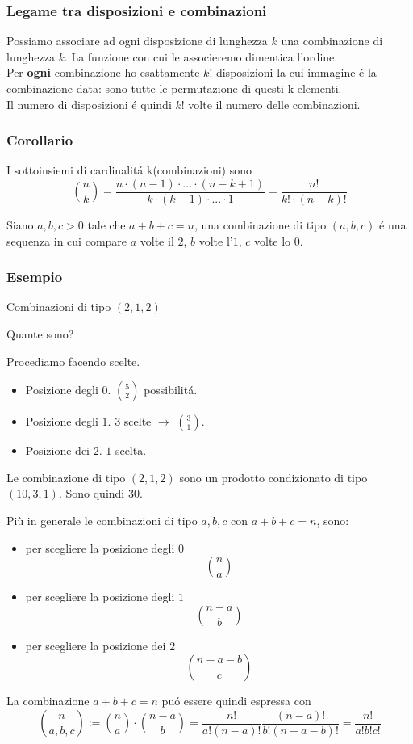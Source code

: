 \documentclass[11pt]{article}
\begin{document}
            \subsubsection{Legame tra disposizioni e combinazioni}
            Possiamo associare ad ogni disposizione di lunghezza $k$ una combinazione di lunghezza $k$. La funzione con cui le associeremo dimentica l'ordine.\\
            Per \textbf{ogni} combinazione ho esattamente $k!$ disposizioni la cui immagine \'e la combinazione data: sono tutte le permutazione di questi k elementi.\\
            Il numero di disposizioni \'e quindi $k!$ volte il numero delle combinazioni.
			\subsubsection{Corollario}
			I sottoinsiemi di cardinalit\'a k(combinazioni) sono \\ \[\binom{n}{k}=\frac{n\cdot(n-1)\cdot...\cdot(n-k+1)}{k\cdot(k-1)\cdot...\cdot1}=\frac{n!}{k!\cdot(n-k)!}\]
			
			Siano $a,b,c > 0$ tale che $a+b+c=n$, una combinazione di tipo
			$(a,b,c)$ \'e una sequenza in cui compare $a$ volte il $2$,
			$b$ volte l'$1$, $c$ volte lo $0$.

			\subsubsection{Esempio}

			Combinazioni di tipo $(2,1,2)$

			Quante sono?

			Procediamo facendo scelte.\begin{itemize}

				\item Posizione degli $0$. $\binom{5}{2}$ possibilit\'a.
				\item Posizione degli $1$. $3$ scelte $\to$ $\binom{3}{1}$.
				\item Posizione dei $2$. $1$ scelta.
			\end{itemize}

			Le combinazione di tipo $(2,1,2)$ sono un prodotto condizionato
			di tipo $(10,3,1)$. Sono quindi $30$.

			Pi\`u in generale le combinazioni di tipo $a,b,c$ con $a+b+c=n$,
			sono: \begin{itemize}
				\item per scegliere la posizione degli $0$ \[\binom{n}{a}\]
				\item per scegliere la posizione degli $1$ \[\binom{n-a}{b}\]
				\item per scegliere la posizione dei $2$ \[\binom{n-a-b}{c}\]
			\end{itemize}
			La combinazione $a+b+c=n$ pu\'o essere quindi espressa con
			\[\binom{n}{a , b , c} := \binom{n}{a} \cdot \binom{n-a}{b} =
				\frac{n!}{a!(n-a)!} \frac{(n-a)!}{b!(n-a-b)!} = 
			\frac{n!}{a!b!c!}\] 
\end{document}
